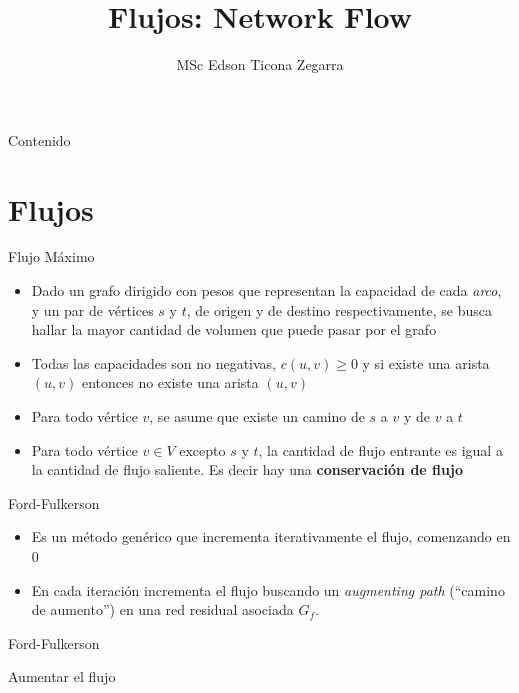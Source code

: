 \documentclass[]{beamer}
\title{Flujos: Network Flow}
\author{MSc Edson Ticona Zegarra}
\institute{Taller avanzado 2025}
\date{}
\begin{document}
\maketitle

\begin{frame}{Contenido}
\tableofcontents
\end{frame}

\section{Flujos}
\begin{frame}{Flujo M\'aximo}
  \begin{itemize}
    \item Dado un grafo dirigido con pesos que representan la capacidad de cada \textit{arco}, y un par de v\'ertices $s$ y $t$, de origen y de destino respectivamente, se busca hallar la mayor cantidad de volumen que puede pasar por el grafo
      \pause
    \item Todas las capacidades son no negativas, $c(u,v) \geq 0$ y si existe una arista $(u,v)$ entonces no existe una arista $(u,v)$
      \pause
    \item Para todo v\'ertice $v$, se asume que existe un camino de $s$ a $v$ y de $v$ a $t$
      \pause
    \item Para todo v\'ertice $v \in V$ excepto $s$ y $t$, la cantidad de flujo entrante es igual a la cantidad de flujo saliente. Es decir hay una \textbf{conservaci\'on de flujo}
  \end{itemize}
\end{frame}

\begin{frame}{Ford-Fulkerson}
  \begin{itemize}
    \item Es un m\'etodo gen\'erico que incrementa iterativamente el flujo, comenzando en 0
      \pause
    \item En cada iteraci\'on incrementa el flujo buscando un \textit{augmenting path} (``camino de aumento'') en una red residual asociada $G_f$.
  \end{itemize}
\end{frame}

\begin{frame}{Ford-Fulkerson}
  \begin{algorithm}[H]
    {
      {Aumentar el flujo}
    }
  \end{algorithm}
\end{frame}
\end{document}
